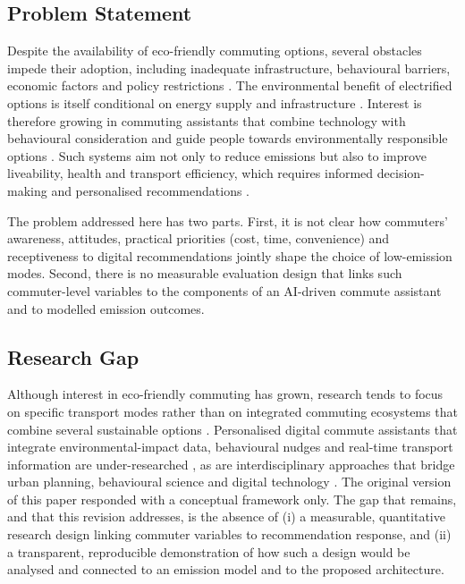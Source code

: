 \documentclass[11pt,a4paper]{article}
\begin{document}
\subsection{Problem Statement}
Despite the availability of eco-friendly commuting options, several obstacles impede their adoption,
including inadequate infrastructure, behavioural barriers, economic factors and policy restrictions
\citep{collazos2024}. The environmental benefit of electrified options is itself conditional on
energy supply and infrastructure \citep{ndhlovu2025}. Interest is therefore growing in commuting
assistants that combine technology with behavioural consideration and guide people towards
environmentally responsible options \citep{eslami2025}. Such systems aim not only to reduce emissions
but also to improve liveability, health and transport efficiency, which requires informed
decision-making and personalised recommendations \citep{lattman2024}.

The problem addressed here has two parts. First, it is not clear how commuters' awareness, attitudes,
practical priorities (cost, time, convenience) and receptiveness to digital recommendations jointly
shape the choice of low-emission modes. Second, there is no measurable evaluation design that links
such commuter-level variables to the components of an AI-driven commute assistant and to modelled
emission outcomes.

\subsection{Research Gap}
Although interest in eco-friendly commuting has grown, research tends to focus on specific transport
modes rather than on integrated commuting ecosystems that combine several sustainable options
\citep{kashem2025}. Personalised digital commute assistants that integrate environmental-impact data,
behavioural nudges and real-time transport information are under-researched \citep{ouyang2025}, as are
interdisciplinary approaches that bridge urban planning, behavioural science and digital technology
\citep{eslami2025}. The original version of this paper responded with a conceptual framework only.
The gap that remains, and that this revision addresses, is the absence of (i) a measurable,
quantitative research design linking commuter variables to recommendation response, and (ii) a
transparent, reproducible demonstration of how such a design would be analysed and connected to an
emission model and to the proposed architecture.
\end{document}
